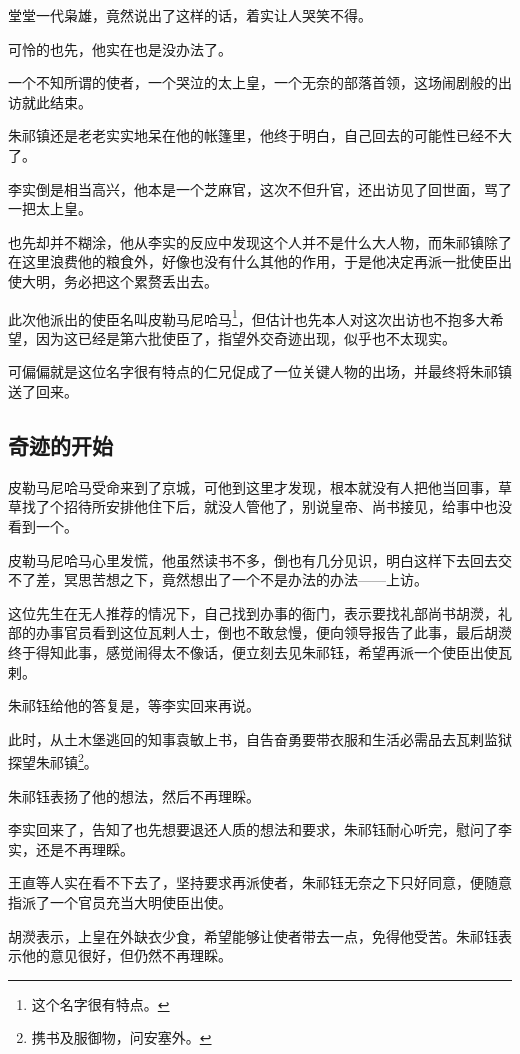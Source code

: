 \begin{multicols}{\theparacolNo}
堂堂一代枭雄，竟然说出了这样的话，着实让人哭笑不得。

可怜的也先，他实在也是没办法了。

一个不知所谓的使者，一个哭泣的太上皇，一个无奈的部落首领，这场闹剧般的出访就此结束。

朱祁镇还是老老实实地呆在他的帐篷里，他终于明白，自己回去的可能性已经不大了。

李实倒是相当高兴，他本是一个芝麻官，这次不但升官，还出访见了回世面，骂了一把太上皇。

也先却并不糊涂，他从李实的反应中发现这个人并不是什么大人物，而朱祁镇除了在这里浪费他的粮食外，好像也没有什么其他的作用，于是他决定再派一批使臣出使大明，务必把这个累赘丢出去。

此次他派出的使臣名叫皮勒马尼哈马\footnote{这个名字很有特点。}，但估计也先本人对这次出访也不抱多大希望，因为这已经是第六批使臣了，指望外交奇迹出现，似乎也不太现实。

可偏偏就是这位名字很有特点的仁兄促成了一位关键人物的出场，并最终将朱祁镇送了回来。

\subsection{奇迹的开始}
皮勒马尼哈马受命来到了京城，可他到这里才发现，根本就没有人把他当回事，草草找了个招待所安排他住下后，就没人管他了，别说皇帝、尚书接见，给事中也没看到一个。

皮勒马尼哈马心里发慌，他虽然读书不多，倒也有几分见识，明白这样下去回去交不了差，冥思苦想之下，竟然想出了一个不是办法的办法——上访。

这位先生在无人推荐的情况下，自己找到办事的衙门，表示要找礼部尚书胡濙，礼部的办事官员看到这位瓦剌人士，倒也不敢怠慢，便向领导报告了此事，最后胡濙终于得知此事，感觉闹得太不像话，便立刻去见朱祁钰，希望再派一个使臣出使瓦剌。

朱祁钰给他的答复是，等李实回来再说。

此时，从土木堡逃回的知事袁敏上书，自告奋勇要带衣服和生活必需品去瓦剌监狱探望朱祁镇\footnote{携书及服御物，问安塞外。}。

朱祁钰表扬了他的想法，然后不再理睬。

李实回来了，告知了也先想要退还人质的想法和要求，朱祁钰耐心听完，慰问了李实，还是不再理睬。

王直等人实在看不下去了，坚持要求再派使者，朱祁钰无奈之下只好同意，便随意指派了一个官员充当大明使臣出使。

胡濙表示，上皇在外缺衣少食，希望能够让使者带去一点，免得他受苦。朱祁钰表示他的意见很好，但仍然不再理睬。


\end{multicols}
